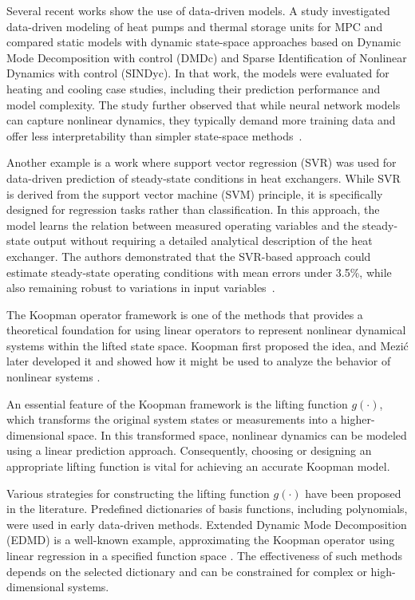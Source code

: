 Several recent works show the use of data-driven models. A study investigated data-driven modeling of heat pumps and thermal storage units for MPC and compared static models with dynamic state-space approaches based on Dynamic Mode Decomposition with control (DMDc) and Sparse Identification of Nonlinear Dynamics with control (SINDyc). In that work, the models were evaluated for heating and cooling case studies, including their prediction performance and model complexity. The study further observed that while neural network models can capture nonlinear dynamics, they typically demand more training data and offer less interpretability than simpler state-space methods \cite{brandes2022}.

Another example is a work where support vector regression (SVR) was used for data-driven prediction of steady-state conditions in heat exchangers. While SVR is derived from the support vector machine (SVM) principle, it is specifically designed for regression tasks rather than classification. In this approach, the model learns the relation between measured operating variables and the steady-state output without requiring a detailed analytical description of the heat exchanger. The authors demonstrated that the SVR-based approach could estimate steady-state operating conditions with mean errors under 3.5\%, while also remaining robust to variations in input variables \cite{wu2025svr}.



The Koopman operator framework is one of the methods that provides a theoretical foundation for using linear operators to represent nonlinear dynamical systems within the lifted state space. Koopman \cite{koopman1931} first proposed the idea, and Mezi\'c later developed it and showed how it might be used to analyze the behavior of nonlinear systems \cite{mezic2005}.

An essential feature of the Koopman framework is the lifting function $g(\cdot)$, which transforms the original system states or measurements into a higher-dimensional space. In this transformed space, nonlinear dynamics can be modeled using a linear prediction approach. Consequently, choosing or designing an appropriate lifting function is vital for achieving an accurate Koopman model.


Various strategies for constructing the lifting function $g(\cdot)$ have been proposed in the literature. Predefined dictionaries of basis functions, including polynomials, were used in early data-driven methods. Extended Dynamic Mode Decomposition (EDMD) is a well-known example, approximating the Koopman operator using linear regression in a specified function space \cite{williams2015}. The effectiveness of such methods depends on the selected dictionary and can be constrained for complex or high-dimensional systems.

